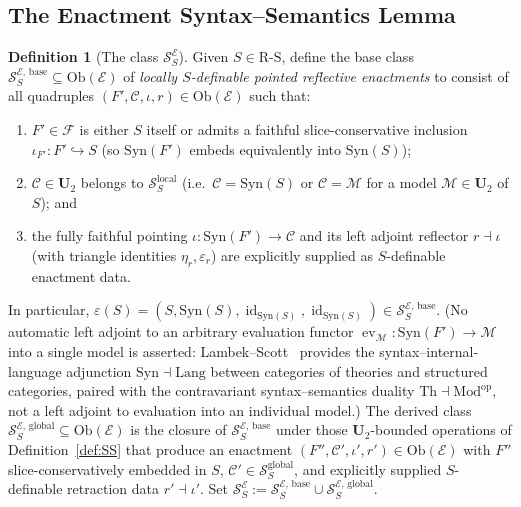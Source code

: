 \documentclass[11pt]{article}
\theoremstyle{plain}
\theoremstyle{definition}
\newtheorem{definition}[theorem]{Definition}
\newcommand{\RS}{\mathrm{R\text{-}S}}
\newcommand{\cS}{\mathcal{S}}
\newcommand{\cF}{\mathcal{F}}
\newcommand{\cM}{\mathcal{M}}
\newcommand{\cC}{\mathcal{C}}
\newcommand{\Ob}{\mathrm{Ob}}
\newcommand{\Syn}{\mathrm{Syn}}
\newcommand{\Mod}{\mathrm{Mod}}
\newcommand{\cE}{\mathcal{E}}
\newcommand{\SSE}{\cS_{S}^{\cE}}
\newcommand{\SSEbase}{\cS_{S}^{\cE,\,\mathrm{base}}}
\newcommand{\SSEglobal}{\cS_{S}^{\cE,\,\mathrm{global}}}
\DeclareMathOperator{\id}{id}
\DeclareMathOperator{\ev}{ev}
\begin{document}
\subsection{The Enactment Syntax--Semantics Lemma}

\begin{definition}[The class $\SSE$]\label{def:SSE}
Given $S \in \RS$, define the base class $\SSEbase \subseteq \Ob(\cE)$ of \emph{locally $S$-definable pointed reflective enactments} to consist of all quadruples $(F', \cC, \iota, r) \in \Ob(\cE)$ such that:
\begin{enumerate}[nosep,label=(\alph*)]
\item $F' \in \cF$ is either $S$ itself or admits a faithful slice-conservative inclusion $\iota_{F'} : F' \hookrightarrow S$ (so $\Syn(F')$ embeds equivalently into $\Syn(S)$);
\item $\cC \in \mathbf{U}_2$ belongs to $\cS_S^{\mathrm{local}}$ (i.e.\ $\cC = \Syn(S)$ or $\cC = \cM$ for a model $\cM \in \mathbf{U}_2$ of $S$); and
\item the fully faithful pointing $\iota : \Syn(F') \to \cC$ and its left adjoint reflector $r \dashv \iota$ (with triangle identities $\eta_r, \varepsilon_r$) are explicitly supplied as $S$-definable enactment data.
\end{enumerate}
In particular, $\varepsilon(S) = (S, \Syn(S), \id_{\Syn(S)}, \id_{\Syn(S)}) \in \SSEbase$. (No automatic left adjoint to an arbitrary evaluation functor $\ev_\cM : \Syn(F') \to \cM$ into a single model is asserted: Lambek--Scott~\cite{LambekScott1986} provides the syntax--internal-language adjunction $\Syn \dashv \mathrm{Lang}$ between categories of theories and structured categories, paired with the contravariant syntax--semantics duality $\mathrm{Th} \dashv \Mod^{\mathrm{op}}$, not a left adjoint to evaluation into an individual model.) The derived class $\SSEglobal \subseteq \Ob(\cE)$ is the closure of $\SSEbase$ under those $\mathbf{U}_2$-bounded operations of Definition~\ref{def:SS} that produce an enactment $(F'', \cC', \iota', r') \in \Ob(\cE)$ with $F''$ slice-conservatively embedded in $S$, $\cC' \in \cS_S^{\mathrm{global}}$, and explicitly supplied $S$-definable retraction data $r' \dashv \iota'$. Set $\SSE := \SSEbase \cup \SSEglobal$.
\end{definition}
\end{document}
